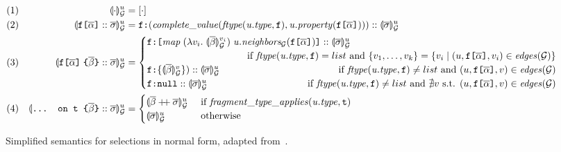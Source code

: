 \begin{figure*}[t]
  \small
  \begin{flushright}
  \end{flushright}
  \centering
    \vspace{-1ex}
    \begin{align*}
    & (1) & \seval{\cdot}{u} &= [\cdot] \\
    & (2) & \sevalu{\fld :: \sset} &= 
    \resp{(\mathit{complete\_value(ftype(u.type, \fkey), u.property(\fld))})} :: \sevalu{\sset} \\
    & (3) & %
    \sevalu{\nfld{\overline{\beta}} :: \sset} &=
    \begin{cases}
      \resp{\texttt{[} \mathit{map}\; (\lambda v_{i}.\; \seval{\overline{\beta}}{v_{i}})\; 
      \mathit{u.neighbors_{\graph}(\fld)} \texttt{]}} :: \sevalu{\sset}  \\
     \hfill \text{ if } 
            \mathit{ftype(u.type, \fkey)} = list \text{ and } \{v_{1}, \ldots, v_{k}\} = 
        \{v_{i} \mid (u, \fld, v_{i}) \in \mathit{edges}(\graph)\} \\
      \resp{\{\seval{\subqueries{\beta}}{v}\})} :: \sevalu{\sset}  
      \hfill \text{ if } 
        \mathit{ftype(u.type, \fkey)}  \neq list \text{ and } (u, \fld, v) \in \mathit{edges}(\graph) \\
      \resp{\nval} :: \sevalu{\sset} 
     \qquad \qquad \qquad \qquad \qquad
    \text{ if } \mathit{ftype(u.type, \fkey)}  \neq list  \text{ and } \nexists v \text{ s.t. }  (u, \fld, v) \in \mathit{edges}(\graph) \\
    \end{cases}\\
    & (4) & \sevalu{\ifrag{t}{\overline{\beta}}:: \sset} &= \begin{cases}
    \sevalu{\overline{\beta} \mdoubleplus \sset} & 
  	\text{ if }\mathit{fragment\_type\_applies (u.type, \texttt{t})}\\
    \sevalu{\sset} & \text{ otherwise}
    \end{cases}
    \end{align*}
    \caption{Simplified semantics for selections in normal form,
      adapted from~\cite{gqlph}.} 
    \label{fig:simpl_semantics}
\end{figure*}

